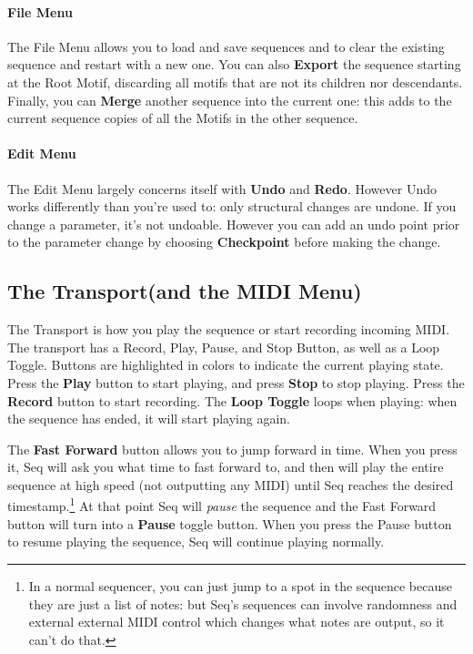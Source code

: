 \documentclass[twoside,10pt]{article}
\begin{document}
\paragraph{File Menu}
The File Menu allows you to load and save sequences and to clear the existing sequence and restart with a new one.  You can also {\bf Export} the sequence starting at the Root Motif, discarding all motifs that are not its children nor descendants.  Finally, you can {\bf Merge} another sequence into the current one: this adds to the current sequence copies of all the Motifs in the other sequence.

\paragraph{Edit Menu}
The Edit Menu largely concerns itself with {\bf Undo} and {\bf Redo}.  However Undo works differently than you're used to: only structural changes are undone.  If you change a parameter, it's not undoable.  However you can add an undo point prior to the parameter change by choosing {\bf Checkpoint} before making the change.


\subsection{The Transport\quad (and the MIDI Menu)}

The Transport is how you play the sequence or start recording incoming MIDI.  The transport has a Record, Play, Pause, and Stop Button, as well as a Loop Toggle.  Buttons are highlighted in colors to indicate the current playing state.  Press the {\bf Play} button to start playing, and press {\bf Stop} to stop playing.  Press the {\bf Record} button to start recording.  The {\bf Loop Toggle} loops when playing: when the sequence has ended, it will start playing again.

The {\bf Fast Forward} button allows you to jump forward in time.  When you press it, Seq will ask you what time to fast forward to, and then will play the entire sequence at high speed (not outputting any MIDI) until Seq reaches the desired timestamp.\footnote{In a normal sequencer, you can just jump to a spot in the sequence because they are just a list of notes: but Seq's sequences can involve randomness and external external MIDI control which changes what notes are output, so it can't do that.}  At that point Seq will {\it pause} the sequence and the Fast Forward button will turn into a {\bf Pause} toggle button.  When you press the Pause button to resume playing the sequence, Seq will continue playing normally. 
\end{document}
